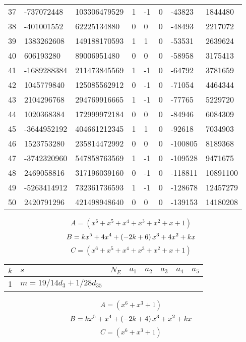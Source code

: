 \documentclass{amsart}
\begin{document}
\begin{longtable}{|l|l|l|lllll|}
37&-737072448&103306479529&1&-1&0&-43823&1844480\\
38&-401001552&62225134880&0&0&0&-48493&2217072\\
39&1383262608&149188170593&1&1&0&-53531&2639624\\
40&606193280&89006951480&0&0&0&-58958&3175413\\
41&-1689288384&211473845569&1&-1&0&-64792&3781659\\
42&1045779840&125085562912&0&-1&0&-71054&4464344\\
43&2104296768&294769916665&1&-1&0&-77765&5229720\\
44&1020368384&172999972184&0&0&0&-84946&6084309\\
45&-3644952192&404661212345&1&1&0&-92618&7034903\\
46&1523753280&235814472992&0&0&0&-100805&8189368\\
47&-3742320960&547858763569&1&-1&0&-109528&9471675\\
48&2469058816&317196039160&0&-1&0&-118811&10891100\\
49&-5263414912&732361736593&1&-1&0&-128678&12457279\\
50&2420791296&421498948640&0&0&0&-139153&14180208\\
\hline
\end{longtable}
$$A=(x^6
 + x^5
 + x^4
 + x^3
 + x^2
 + x
 + 1)$$
$$B=k\*x^5
 + 4\*x^4
 + \left(-2\*k
 + 6\right) \*x^3
 + 4\*x^2
 + k\*x$$
$$C=(x^6
 + x^5
 + x^4
 + x^3
 + x^2
 + x
 + 1)$$
\begin{longtable}{|l|l|l|lllll|}
\hline
$k$ & $s$ & $N_E$ & $a_1$ & $a_2$ & $a_3$ & $a_4$ & $a_5$\\
\hline
1&$m=19/14d_{3}+1/28d_{35}$&&\multicolumn{5}{c|}{}\\
\hline
\end{longtable}
$$A=(x^6
 + x^3
 + 1)$$
$$B=k\*x^5
 + x^4
 + \left(-2\*k
 + 4\right) \*x^3
 + x^2
 + k\*x$$
$$C=(x^6
 + x^3
 + 1)$$
\end{document}
